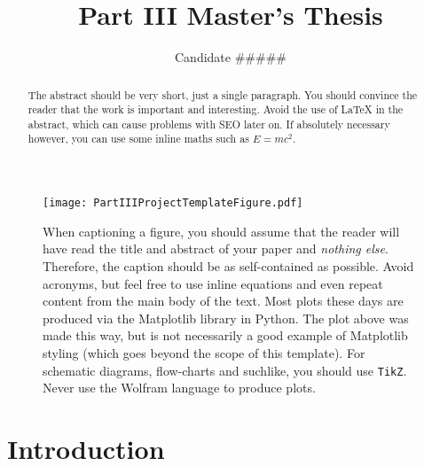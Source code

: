 \documentclass[aps,prd,reprint,preprintnumbers,showpacs,floatfix,nofootinbib,superscript address]{revtex4-2}
\begin{document}
\title{Part III Master's Thesis}

\author{Candidate \#\#\#\#\#}

\begin{abstract}
	The abstract should be very short, just a single paragraph. You should convince the reader that the work is important and interesting. Avoid the use of \LaTeX{} in the abstract, which can cause problems with SEO later on. If absolutely necessary however, you can use some inline maths such as $E=mc^2$.
\end{abstract}


\maketitle

\begin{figure}[t!]
  \center
  \texttt{[image: PartIIIProjectTemplateFigure.pdf]}
	\caption{\label{PartIIIProjectTemplateFigure} 
	When captioning a figure, you should assume that the reader will have read the title and abstract of your paper and \textit{nothing else}. Therefore, the caption should be as self-contained as possible. Avoid acronyms, but feel free to use inline equations and even repeat content from the main body of the text. Most plots these days are produced via the Matplotlib library in Python. The plot above was made this way, but is not necessarily a good example of Matplotlib styling (which goes beyond the scope of this template). For schematic diagrams, flow-charts and suchlike, you should use \texttt{TikZ}. Never use the Wolfram language to produce plots.
	}
\end{figure}

\section{Introduction}\label{Introduction}
\end{document}
